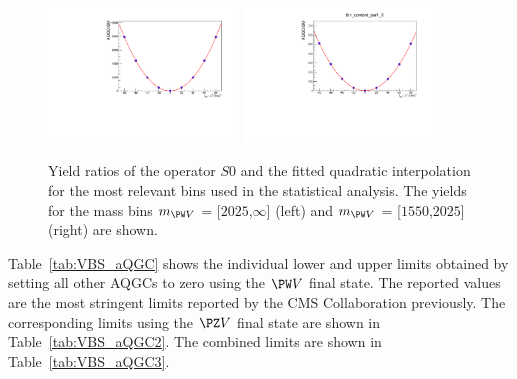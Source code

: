 \begin{figure}[htb]
\centering
\includegraphics[width=0.45\textwidth]{Plots/plots/aqgc_pol2.pdf}
\includegraphics[width=0.45\textwidth]{Plots/plots/aqgc_pol2_bin.pdf}
\caption{Yield ratios of the operator $S0$ and the fitted quadratic interpolation for the most relevant bins used in the statistical analysis. The yields for the mass bins $m_{\PW V}$ = [$2025$,$\infty$] (left) and  $m_{\PW V}$ = [$1550$,$2025$] (right) are shown.}
\label{fig:aqgc_pol}
\end{figure}

Table~\ref{tab:VBS_aQGC} shows the individual lower and upper limits obtained by setting all other AQGCs to zero using the $\PW V$ final state. The reported values are the most stringent limits reported by the CMS Collaboration previously. The corresponding limits using the $\PZ V$ final state are shown in Table~\ref{tab:VBS_aQGC2}. The combined limits are shown in Table~\ref{tab:VBS_aQGC3}.


